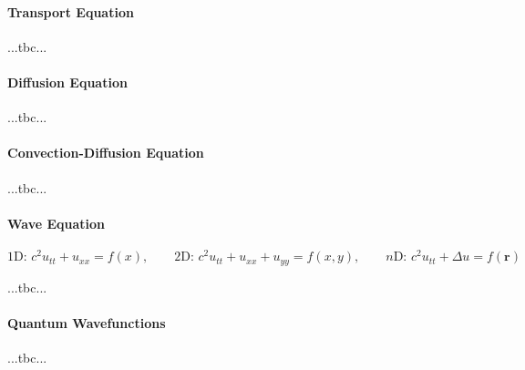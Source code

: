 \paragraph{Transport Equation} ...tbc...


\paragraph{Diffusion Equation} ...tbc...


\paragraph{Convection-Diffusion Equation} ...tbc...


\paragraph{Wave Equation}


\begin{equation}
1\text{D:  } c^2 u_{tt} + u_{xx} = f(x), \qquad 
2\text{D:  } c^2 u_{tt} + u_{xx} + u_{yy} = f(x,y), \qquad 
n\text{D:  } c^2 u_{tt} + \Delta u = f(\mathbf{r})
\end{equation}

 ...tbc...

\paragraph{Quantum Wavefunctions} ...tbc...

